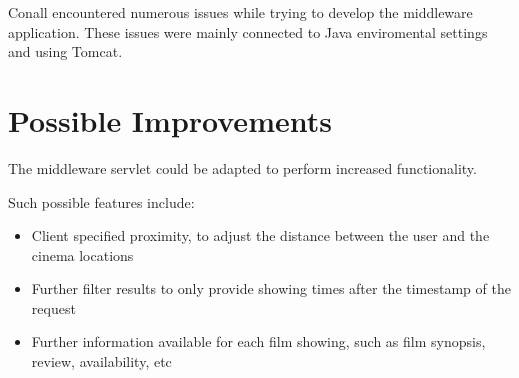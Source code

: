 \documentclass[a4paper,12pt]{article}
\begin{document}
Conall encountered numerous issues while trying to develop the
middleware application. These issues were mainly connected to Java
enviromental settings and using Tomcat.

\section{Possible Improvements}

The middleware servlet could be adapted to perform increased
functionality. 

Such possible features include:

\begin{itemize}
\item Client specified proximity, to adjust the distance between the user and the cinema locations

\item Further filter results to only provide showing times after the timestamp of the request

\item Further information available for each film showing, such as film synopsis, review, availability, etc
\end{itemize}
\end{document}
